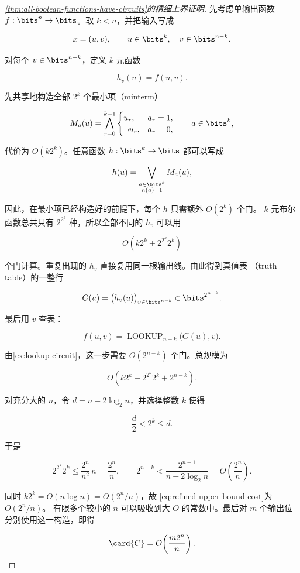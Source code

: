 \begin{proof}[\cref{thm:all-boolean-functions-have-circuits}的精细上界证明]
  先考虑单输出函数 $f:\bits^n\to\bits$。取 $k<n$，并把输入写成

  \[
    x=(u,v),
    \qquad
    u\in\bits^k,
    \quad
    v\in\bits^{n-k}.
  \]

  对每个 $v\in\bits^{n-k}$，定义 $k$ 元函数

  \[
    h_v(u)=f(u,v).
  \]

  先共享地构造全部 $2^k$ 个最小项（minterm）

  \[
    M_a(u)=\bigwedge_{r=0}^{k-1}
    \begin{cases}
      u_r, & a_r=1,\\
      \neg u_r, & a_r=0,
    \end{cases}
    \qquad a\in\bits^k,
  \]

  代价为 $O(k2^k)$。任意函数 $h:\bits^k\to\bits$ 都可以写成

  \[
    h(u)=\bigvee_{\substack{a\in\bits^k\\h(a)=1}}M_a(u),
  \]

  因此，在最小项已经构造好的前提下，每个 $h$ 只需额外 $O(2^k)$ 个门。
  $k$ 元布尔函数总共只有 $2^{2^k}$ 种，所以全部不同的 $h_v$ 可以用

  \[
    O\!\left(k2^k+2^{2^k}2^k\right)
  \]

  个门计算。重复出现的 $h_v$ 直接复用同一根输出线。由此得到真值表
  （truth table）的一整行

  \[
    G(u)=\bigl(h_v(u)\bigr)_{v\in\bits^{n-k}}
    \in\bits^{2^{n-k}}.
  \]

  最后用 $v$ 查表：

  \[
    f(u,v)=\operatorname{LOOKUP}_{n-k}\bigl(G(u),v\bigr).
  \]

  由\cref{ex:lookup-circuit}，这一步需要 $O(2^{n-k})$ 个门。总规模为

  \begin{equation}
    \label{eq:refined-upper-bound-cost}
    O\!\left(k2^k+2^{2^k}2^k+2^{n-k}\right).
  \end{equation}

  对充分大的 $n$，令 $d=n-2\log_2 n$，并选择整数 $k$ 使得

  \[
    \frac d2<2^k\leq d.
  \]

  于是

  \[
    2^{2^k}2^k
      \leq \frac{2^n}{n^2}\,n
      =\frac{2^n}{n},
    \qquad
    2^{n-k}
      <\frac{2^{n+1}}{n-2\log_2 n}
      =O\!\left(\frac{2^n}{n}\right).
  \]

  同时 $k2^k=O(n\log n)=O(2^n/n)$，故
  \cref{eq:refined-upper-bound-cost}为 $O(2^n/n)$。
  有限多个较小的 $n$ 可以吸收到大 $O$ 的常数中。最后对 $m$ 个输出位
  分别使用这一构造，即得

  \[
    \card{C}=O\!\left(\frac{m2^n}{n}\right).
  \]
\end{proof}

